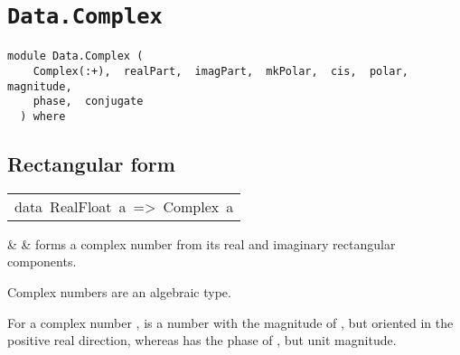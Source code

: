\chapter{\texttt{Data.Complex}}
\label{module:Data.Complex}
\haddockbeginheader
{\haddockverb\begin{verbatim}
module Data.Complex (
    Complex(:+),  realPart,  imagPart,  mkPolar,  cis,  polar,  magnitude, 
    phase,  conjugate
  ) where\end{verbatim}}
\haddockendheader

\section{Rectangular form
}
\begin{haddockdesc}
\item[\begin{tabular}{@{}l}
data\ RealFloat\ a\ =>\ Complex\ a
\end{tabular}]\haddockbegindoc
\haddockbeginconstrs
\haddockdecltt{=} &  & forms a complex number from its real and imaginary
 rectangular components.
 \\
\haddockendconstrs\par
Complex numbers are an algebraic type.
\par
For a complex number ,  is a number with the magnitude of ,
 but oriented in the positive real direction, whereas 
 has the phase of , but unit magnitude.
\par

\end{haddockdesc}
\begin{haddockdesc}
\item[\begin{tabular}{@{}l}
instance\ Typeable1\ Complex\\instance\ RealFloat\ a\ =>\ Eq\ (Complex\ a)\\instance\ RealFloat\ a\ =>\ Floating\ (Complex\ a)\\instance\ RealFloat\ a\ =>\ Fractional\ (Complex\ a)\\instance\ (Data\ a,\ RealFloat\ a)\ =>\ Data\ (Complex\ a)\\instance\ RealFloat\ a\ =>\ Num\ (Complex\ a)\\instance\ (Read\ a,\ RealFloat\ a)\ =>\ Read\ (Complex\ a)\\instance\ RealFloat\ a\ =>\ Show\ (Complex\ a)
\end{tabular}]
\end{haddockdesc}
